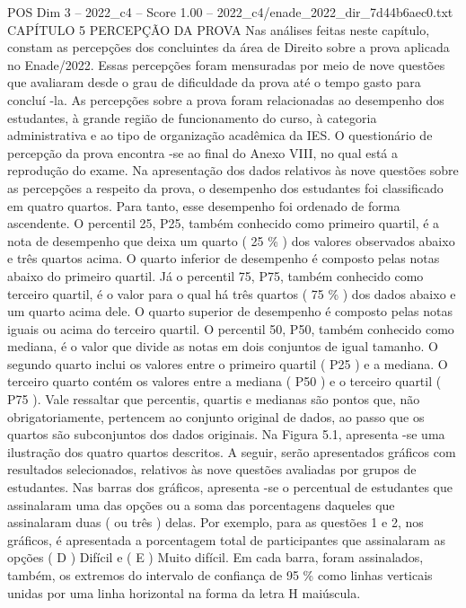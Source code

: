 \begin{textsample}{POS Dim 3 – 2022\_c4 – Score 1.00 – 2022\_c4/enade\_2022\_dir\_7d44b6aec0.txt}  \label{ex:f3_pos_173}
CAPÍTULO 5 PERCEPÇÃO DA PROVA Nas análises feitas neste capítulo, constam as percepções dos concluintes da área de Direito sobre a prova aplicada no Enade/2022.
Essas percepções foram mensuradas por meio de nove questões que avaliaram desde o grau de dificuldade da prova até o tempo gasto para concluí -la.
As percepções sobre a prova foram relacionadas ao desempenho dos estudantes, à grande região de funcionamento do curso, à categoria administrativa e ao tipo de organização acadêmica da IES.
O questionário de percepção da prova encontra -se ao final do Anexo VIII, no qual está a reprodução do exame.
Na apresentação dos dados relativos às nove questões sobre as percepções a respeito da prova, o desempenho dos estudantes foi classificado em quatro quartos.
Para tanto, esse desempenho foi ordenado de forma ascendente.
O percentil 25, P25, também conhecido como primeiro quartil, é a nota de desempenho que deixa um quarto ( 25 \% ) dos valores observados abaixo e três quartos acima.
O quarto inferior de desempenho é composto pelas notas abaixo do primeiro quartil.
Já o percentil 75, P75, também conhecido como terceiro quartil, é o valor para o qual há três quartos ( 75 \% ) dos dados abaixo e um quarto acima dele.
O quarto superior de desempenho é composto pelas notas iguais ou acima do terceiro quartil.
O percentil 50, P50, também conhecido como mediana, é o valor que divide as notas em dois conjuntos de igual tamanho.
O segundo quarto inclui os valores entre o primeiro quartil ( P25 ) e a mediana.
O terceiro quarto contém os valores entre a mediana ( P50 ) e o terceiro quartil ( P75 ).
Vale ressaltar que percentis, quartis e medianas são pontos que, não obrigatoriamente, pertencem ao conjunto original de dados, ao passo que os quartos são subconjuntos dos dados originais.
Na Figura 5.1, apresenta -se uma ilustração dos quatro quartos descritos.
A seguir, serão apresentados gráficos com resultados selecionados, relativos às nove questões avaliadas por grupos de estudantes.
Nas barras dos gráficos, apresenta -se o percentual de estudantes que assinalaram uma das opções ou a soma das porcentagens daqueles que assinalaram duas ( ou três ) delas.
Por exemplo, para as questões 1 e 2, nos gráficos, é apresentada a porcentagem total de participantes que assinalaram as opções ( D ) Difícil e ( E ) Muito difícil.
Em cada barra, foram assinalados, também, os extremos do intervalo de confiança de 95 \% como linhas verticais unidas por uma linha horizontal na forma da letra H maiúscula.

\end{textsample}
